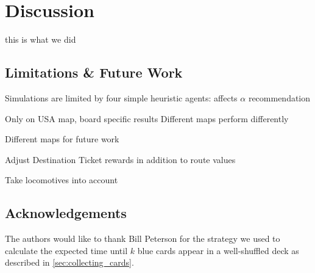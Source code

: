 \newpage
\section{Discussion}
this is what we did


\subsection{Limitations \& Future Work}
Simulations are limited by four
simple heuristic agents: affects
$\alpha$ recommendation

Only on USA map, board specific results
Different maps perform differently
\cite{de2017playtesting}

Different maps for future work

Adjust Destination Ticket rewards
in addition to route values

Take locomotives into account

\subsection{Acknowledgements}
The authors would like to thank Bill Peterson for
the strategy we used to calculate the expected time
until $k$ blue cards appear in a well-shuffled deck
as described in \cref{sec:collecting_cards}.
